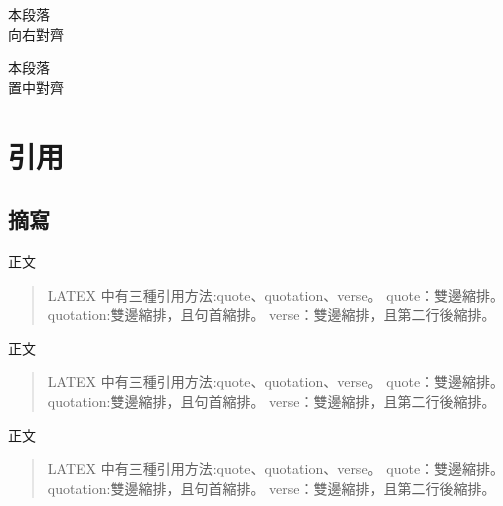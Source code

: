\begin{flushright}
    本段落\\
    向右對齊
\end{flushright}

\begin{center}
    本段落\\
    置中對齊
\end{center}

\section{引用}
\subsection{摘寫}\label{ssec_qute}
正文
\begin{quote}
    LATEX 中有三種引用方法:quote、quotation、verse。
    quote：雙邊縮排。
    quotation:雙邊縮排，且句首縮排。
    verse：雙邊縮排，且第二行後縮排。
\end{quote}
正文
\begin{quotation}
    LATEX 中有三種引用方法:quote、quotation、verse。
    quote：雙邊縮排。
    quotation:雙邊縮排，且句首縮排。
    verse：雙邊縮排，且第二行後縮排。
\end{quotation}
正文
\begin{verse}
    LATEX 中有三種引用方法:quote、quotation、verse。
    quote：雙邊縮排。
    quotation:雙邊縮排，且句首縮排。
    verse：雙邊縮排，且第二行後縮排。
\end{verse}



\newpage


